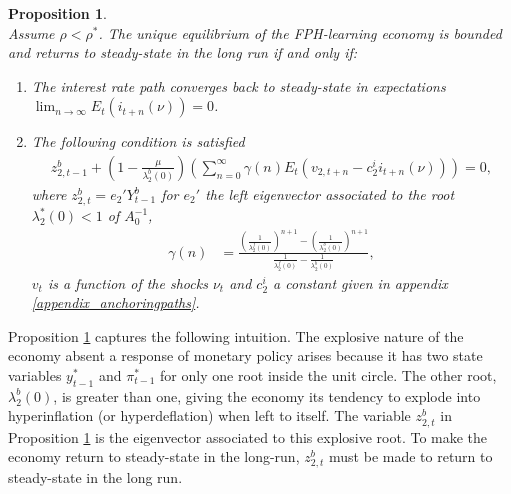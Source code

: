 \documentclass{article}
\newtheorem{proposition}{Proposition}
\begin{document}
\begin{proposition}\label{proposition_anchoringpaths}
	~\\
Assume $\rho<\rho^*$. %
The unique equilibrium of the FPH-learning economy is bounded and returns to steady-state in the long run if and only if:
\begin{enumerate}[label=(\roman*)]
\item The interest rate path converges back to steady-state in expectations $\lim_{n \rightarrow \infty} E_t(i_{t+n}(\nu))=0$.
\item The following condition is satisfied
\begin{align}
z^b_{2,t-1} + \left(1-\frac{\mu}{\lambda^b_2(0)}\right) \left(
\sum_{n=0}^{\infty} \gamma(n) E_t(v_{2,t+n}-c^i_2 i_{t+n}(\nu)) \right) = 0,\label{eq_condition_anchoringpaths}
\end{align}
where $z^b_{2,t} = e_2' Y^b_{t-1}$ for $e_2'$ the left eigenvector associated to the root $\lambda^*_2(0)<1$ of $A_0^{-1}$,
\begin{align}
\gamma(n) &= \frac{\left(\frac{1}{\lambda^f_2(0)}\right)^{n+1} - \left(\frac{1}{\lambda^b_2(0)}\right)^{n+1}}
{\frac{1}{\lambda^f_2(0)}-\frac{1}{\lambda^b_2(0)}},
\end{align}
$v_t$ is a function of the shocks $\nu_t$ and $c^i_2$ a constant given in appendix \ref{appendix_anchoringpaths}.
\end{enumerate}
\end{proposition}

Proposition \ref{proposition_anchoringpaths} captures the following intuition. The explosive nature of the economy absent a response of monetary policy arises because it has two state variables $y_{t-1}^*$ and $\pi_{t-1}^*$ for only one root inside the unit circle. The other root, $\lambda^b_2(0)$, is greater than one, giving the economy its tendency to explode into hyperinflation (or hyperdeflation) when left to itself. The variable $z^b_{2,t}$ in Proposition \ref{proposition_anchoringpaths} is the eigenvector associated to this explosive root. To make the economy return to steady-state in the long-run, $z^b_{2,t}$ must be made to return to steady-state in the long run.
\end{document}
